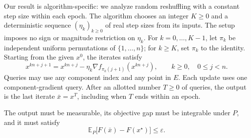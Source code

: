 \documentclass[10pt]{article}
\theoremstyle{definition}
\begin{document}
Our result is algorithm-specific: we analyze random reshuffling with a constant step size within each epoch. The algorithm chooses an integer $K\geq0$ and a deterministic sequence $(\eta_k)_{k\geq0}$ of real step sizes from its inputs. The setup imposes no sign or magnitude restriction on $\eta_k$. For $k=0,\ldots,K-1$, let $\pi_k$ be independent uniform permutations of $\{1,\ldots,n\}$; for $k\geq K$, set $\pi_k$ to the identity. Starting from the given $x^0$, the iterates satisfy
\[
x^{kn+j+1}
=x^{kn+j}-\eta_k\nabla f_{\pi_k(j+1)}(x^{kn+j}),
\qquad k\geq0,\quad 0\leq j<n.
\]
Queries may use any component index and any point in $E$. Each update uses one component-gradient query. After an allotted number $T\geq0$ of queries, the output is the last iterate $\bar{x}=x^T$, including when $T$ ends within an epoch.

The output must be measurable, its objective gap must be integrable under $P$, and it must satisfy
\[
\mathbb{E}_{P}\bigl[F(\bar{x})-F(x^\star)\bigr]\leq\varepsilon.
\]
\end{document}
